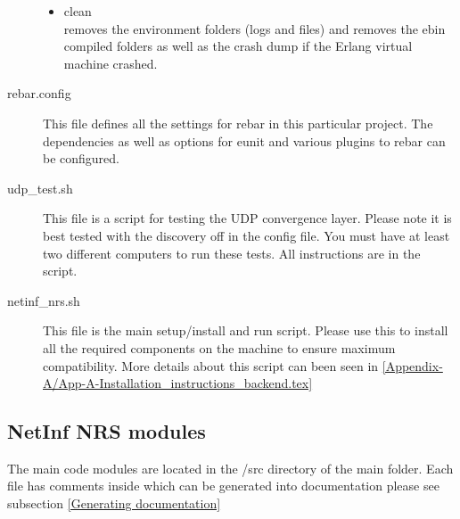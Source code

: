 \begin{description}
\begin{itemize}
\item clean \\
removes the environment folders (logs and files) and removes the ebin compiled folders as well as the crash dump if the Erlang virtual machine crashed.
\end{itemize}
\item[rebar.config]
This file defines all the settings for rebar in this particular project. The dependencies as well as options for eunit and various plugins to rebar can be configured.
\item[udp\_test.sh]
This file is a script for testing the UDP convergence layer. Please note it is best tested with the discovery off in the config file. You must have at least two different computers to run these tests. All instructions are in the script. 
\item[netinf\_nrs.sh]
This file is the main setup/install and run script. Please use this to install all the required components on the machine to ensure maximum compatibility. More details about this script can been seen in \ref{Appendix-A/App-A-Installation_instructions_backend.tex}
\end{description}

\subsection {NetInf NRS modules}

The main code modules are located in the /src directory of the main folder. Each file has comments inside which can be generated into documentation please see subsection \ref{Generating documentation}

